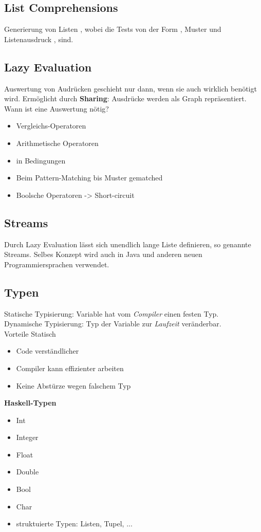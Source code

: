 \subsection{List Comprehensions}
Generierung von Listen \code{\([e | q_1, ..., q_m]\)}, wobei die  Tests von der Form
, Muster  und Listenausdruck , sind.

\subsection{Lazy Evaluation}
Auswertung von Audrücken geschieht nur dann, wenn sie auch wirklich benötigt wird. Ermöglicht durch \textbf{Sharing}:
Ausdrücke werden als Graph repräsentiert.\\
Wann ist eine Auswertung nötig?
\begin{itemize}
  \item Vergleichs-Operatoren
  \item Arithmetische Operatoren
  \item in Bedingungen
  \item Beim Pattern-Matching bis Muster gematched
  \item Boolsche Operatoren -> Short-circuit
\end{itemize}

\subsection{Streams}
Durch Lazy Evaluation lässt sich unendlich lange Liste definieren, so genannte Streams.
Selbes Konzept wird auch in Java und anderen neuen Programmiersprachen verwendet.

\subsection{Typen}
Statische Typisierung: Variable hat vom \textit{Compiler} einen festen Typ.\\
Dynamische Typisierung: Typ der Variable zur \textit{Laufzeit} veränderbar.\\
Vorteile Statisch
\begin{itemize}
  \item Code verständlicher
  \item Compiler kann effizienter arbeiten
  \item Keine Abstürze wegen falschem Typ
\end{itemize}
\textbf{Haskell-Typen}
\begin{itemize}
  \item Int
  \item Integer
  \item Float
  \item Double
  \item Bool
  \item Char
  \item struktuierte Typen: Listen, Tupel, ...
\end{itemize}

